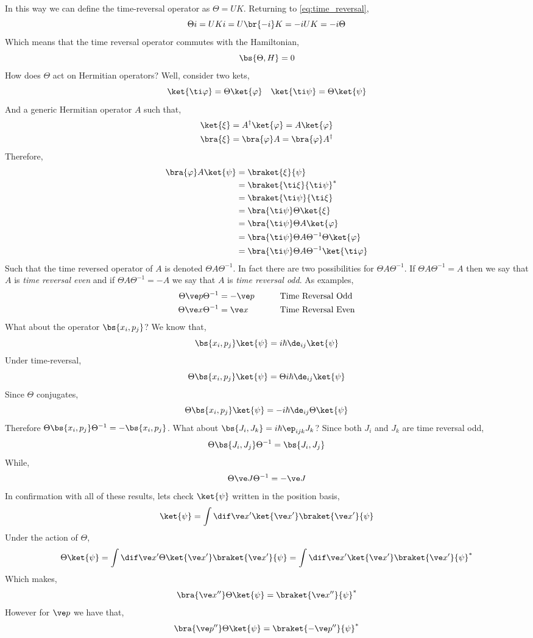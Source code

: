 \documentclass{article}
\begin{document}
In this way we can define the time-reversal operator as $\Theta = U K$. Returning to \cref{eq:time_reversal},
\[ \Theta i = U K i = U \br{-i} K = - i U K = - i \Theta \]
Which means that the time reversal operator commutes with the Hamiltonian,
\[ \bs{\Theta, H} = 0 \]
How does $\Theta$ act on Hermitian operators? Well, consider two kets,
\[ \ket{\ti \varphi} = \Theta \ket{\varphi} \quad \ket{\ti \psi} = \Theta \ket{\psi} \]
And a generic Hermitian operator $A$ such that,
\begin{align*}
\ket{\xi} &= A^{\dagger} \ket{\varphi} = A \ket{\varphi} \\
\bra{\xi} &= \bra{\varphi}A = \bra{\varphi}A^{\dagger}
\end{align*}
Therefore,
\begin{align*}
    \bra{\varphi} A \ket{\psi}
    &= \braket{\xi}{\psi} \\
    &= \braket{\ti \xi}{\ti \psi}^* \\
    &= \braket{\ti \psi}{\ti \xi} \\
    &= \bra{\ti \psi}\Theta\ket{\xi} \\
    &= \bra{\ti \psi}\Theta A\ket{\varphi} \\
    &= \bra{\ti \psi}\Theta A \Theta^{-1} \Theta \ket{\varphi} \\
    &= \bra{\ti \psi}\Theta A \Theta^{-1} \ket{\ti \varphi}
\end{align*}
Such that the time reversed operator of $A$ is denoted $\Theta A \Theta^{-1}$. In fact there are two possibilities for $\Theta A \Theta^{-1}$. If $\Theta A \Theta^{-1} = A$ then we say that $A$ is \textit{time reversal even} and if $\Theta A \Theta^{-1} = - A$ we say that $A$ is \textit{time reversal odd}. As examples,
\begin{alignat*}{2}
    \Theta \ve p \Theta^{-1} &= - \ve p \qquad &&\text{Time Reversal Odd} \\
    \Theta \ve x \Theta^{-1} &= \ve x \qquad &&\text{Time Reversal Even}
\end{alignat*}
What about the operator $\bs{x_i, p_j}$? We know that,
\[ \bs{x_i, p_j} \ket{\psi} = i\hbar \de_{ij} \ket{\psi} \]
Under time-reversal,
\[ \Theta \bs{x_i, p_j} \ket{\psi} = \Theta i\hbar \de_{ij} \ket{\psi} \]
Since $\Theta$ conjugates,
\[ \Theta \bs{x_i, p_j} \ket{\psi} = - i\hbar \de_{ij} \Theta \ket{\psi} \]
Therefore $\Theta \bs{x_i, p_j} \Theta^{-1} = - \bs{x_i, p_j}$. What about $\bs{J_i, J_k} = i \hbar \ep_{ijk} J_k$? Since both $J_i$ and $J_k$ are time reversal odd,
\[ \Theta \bs{J_i, J_j} \Theta^{-1} = \bs{J_i, J_j} \]
While,
\[ \Theta \ve J \Theta^{-1} = - \ve J \]
In confirmation with all of these results, lets check $\ket{\psi}$ written in the position basis,
\[ \ket{\psi} = \int \dif \ve x' \ket{\ve x'}\braket{\ve x'}{\psi} \]
Under the action of $\Theta$,
\[ \Theta \ket{\psi} = \int \dif \ve x' \Theta \ket{\ve x'}\braket{\ve x'}{\psi} = \int \dif \ve x' \ket{\ve x'}\braket{\ve x'}{\psi}^* \]
Which makes,
\[ \bra{\ve x''}\Theta \ket{\psi} = \braket{\ve x''}{\psi}^* \]
However for $\ve p$ we have that,
\[ \bra{\ve p''}\Theta \ket{\psi} = \braket{-\ve p''}{\psi}^* \]
\end{document}
